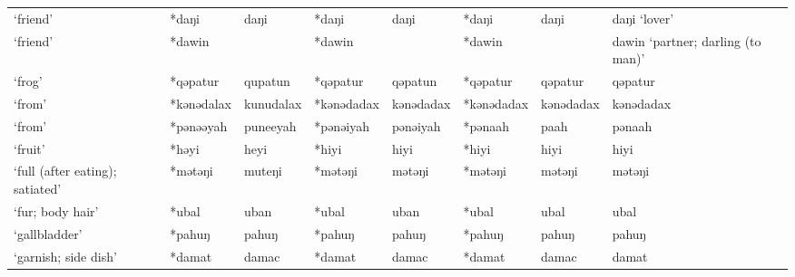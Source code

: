 \begin{landscape}
\begin{longtable}[c]{@{}p{3cm}<{\raggedright}p{2.75cm}<{\raggedright}p{2.75cm}<{\raggedright}p{2.75cm}<{\raggedright}p{2.75cm}<{\raggedright}p{2.75cm}<{\raggedright}p{2.75cm}<{\raggedright}p{2.75cm}<{\raggedright}@{}}
`friend'                                             & *daŋi              & daŋi                           & *daŋi              & daŋi                       & *daŋi            & daŋi                     & daŋi `lover'                      \\
`friend'                                             & *dawin             &                                & *dawin             &                            & *dawin           &                          & dawin `partner; darling (to man)' \\
`frog'                                               & *qəpatur           & qupatun                        & *qəpatur           & qəpatun                    & *qəpatur         & qəpatur                  & qəpatur                           \\
`from'                                               & *kənədalax         & kunudalax                      & *kənədadax         & kənədadax                  & *kənədadax       & kənədadax                & kənədadax                         \\
`from'                                               & *pənəəyah          & puneeyah                       & *pənəiyah          & pənəiyah                   & *pənaah          & paah                     & pənaah                            \\
`fruit'                                              & *həyi              & heyi                           & *hiyi              & hiyi                       & *hiyi            & hiyi                     & hiyi                              \\
`full (after eating); satiated'                      & *mətəŋi            & muteŋi                         & *mətəŋi            & mətəŋi                     & *mətəŋi          & mətəŋi                   & mətəŋi                            \\
`fur; body hair'                                     & *ubal              & uban                           & *ubal              & uban                       & *ubal            & ubal                     & ubal                              \\
`gallbladder'                                        & *pahuŋ             & pahuŋ                          & *pahuŋ             & pahuŋ                      & *pahuŋ           & pahuŋ                    & pahuŋ                             \\
`garnish; side dish'                                 & *damat             & damac                          & *damat             & damac                      & *damat           & damac                    & damat                             \\

\end{longtable}
\end{landscape}
